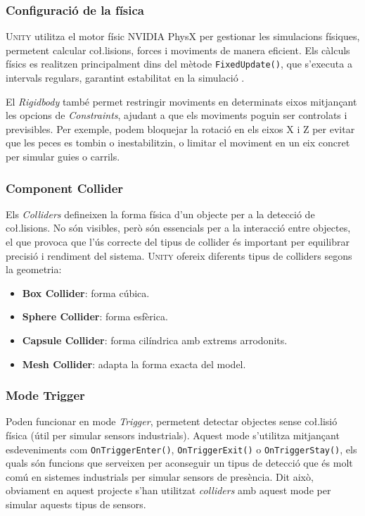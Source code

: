 \documentclass[a4paper,11pt,DIV=13,headings=normal,abstract=true,twoside=semi]{article}
\newcommand{\acro}[1]{\textsc{#1}}
\begin{document}
\subsubsection*{Configuració de la física}

\acro{Unity} utilitza el motor físic NVIDIA PhysX \cite{UnityPhysics} per gestionar les simulacions físiques, permetent calcular co\l.lisions, forces i moviments de manera eficient. Els càlculs físics es realitzen principalment dins del mètode \texttt{FixedUpdate()}, que s'executa a intervals regulars, garantint estabilitat en la simulació \cite{UnityUpdate}.

El \emph{Rigidbody} també permet restringir moviments en determinats eixos mitjançant les opcions de \emph{Constraints}, ajudant a que els moviments poguin ser controlats i previsibles. Per exemple, podem bloquejar la rotació en els eixos X i Z per evitar que les peces es tombin o inestabilitzin, o limitar el moviment en un eix concret per simular guies o carrils.

\subsubsection{Component Collider}

Els \emph{Colliders} \cite{UnityColliders} defineixen la forma física d'un objecte per a la detecció de co\l.lisions. No són visibles, però són essencials per a la interacció entre objectes, el que provoca que l'ús correcte del tipus de collider és important per equilibrar precisió i rendiment del sistema. \acro{Unity} ofereix diferents tipus de colliders segons la geometria:

\begin{itemize}
\item \textbf{Box Collider}: forma cúbica.
\item \textbf{Sphere Collider}: forma esfèrica.
\item \textbf{Capsule Collider}: forma cilíndrica amb extrems arrodonits.
\item \textbf{Mesh Collider}: adapta la forma exacta del model.
\end{itemize}

\subsubsection*{Mode Trigger}

Poden funcionar en mode \emph{Trigger}, permetent detectar objectes sense co\l.lisió física (útil per simular sensors industrials). Aquest mode s'utilitza mitjançant esdeveniments com \texttt{OnTriggerEnter()}, \texttt{OnTriggerExit()} o \texttt{OnTriggerStay()}, els quals són funcions que serveixen per aconseguir un tipus de detecció que és molt comú en sistemes industrials per simular sensors de presència. Dit això, obviament en aquest projecte s'han utilitzat \emph{colliders} amb aquest mode per simular aquests tipus de sensors.
\end{document}
